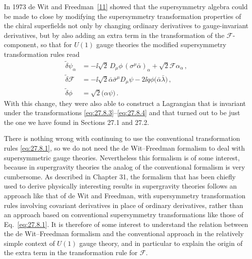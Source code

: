 In 1973 de Wit and Freedman~\hyperref[ch27-ref-11]{[11]} showed that the
supersymmetry algebra could be made to close by modifying the supersymmetry
transformation properties of the chiral superfields not only by changing
ordinary derivatives to gauge-invariant derivatives, but by also adding an
extra term in the transformation of the \(\mathcal{F}\)-component, so that
for \(U(1)\) gauge theories the modified supersymmetry transformation rules
read
\begin{equation}
  \begin{aligned}
    \widetilde{\delta}\psi_\alpha
    &=-\ii\sqrt{2}\,D_\mu\phi\,
      (\sigma^\mu\bar\alpha)_\alpha
      +\sqrt{2}\mathcal{F}\alpha_\alpha\,,\\
    \widetilde{\delta}\mathcal{F}
    &=-\ii\sqrt{2}\bar\alpha\bar\sigma^\mu D_\mu\psi
      -2\ii q\phi\bigl(\bar\alpha\bar\lambda\bigr)\,,\\
    \widetilde{\delta}\phi
    &=\sqrt{2}\bigl(\alpha\psi\bigr)\,.
  \end{aligned}
  \tag{27.8.4}\label{eq:27.8.4}
\end{equation}
With this change, they were also able to construct a Lagrangian that is
invariant under the transformations \eqref{eq:27.8.3}--\eqref{eq:27.8.4}
and that turned out to be just the one we have found in Sections 27.1 and
27.2.

There is nothing wrong with continuing to use the conventional
transformation rules \eqref{eq:27.8.1}, so we do not need the de
Wit--Freedman formalism to deal with supersymmetric gauge theories.
Nevertheless this formalism is of some interest, because in supergravity
theories the analog of the conventional formalism is very cumbersome. As
described in Chapter 31, the formalism that has been chiefly used to derive
physically interesting results in supergravity theories follows an approach
like that of de Wit and Freedman, with supersymmetry transformation rules
involving covariant derivatives in place of ordinary derivatives, rather
than an approach based on conventional supersymmetry transformations like
those of Eq.~\eqref{eq:27.8.1}. It is therefore of some interest to
understand the relation between the de Wit--Freedman formalism and the
conventional approach in the relatively simple context of \(U(1)\) gauge
theory, and in particular to explain the origin of the extra term in the
transformation rule for \(\mathcal{F}\).

